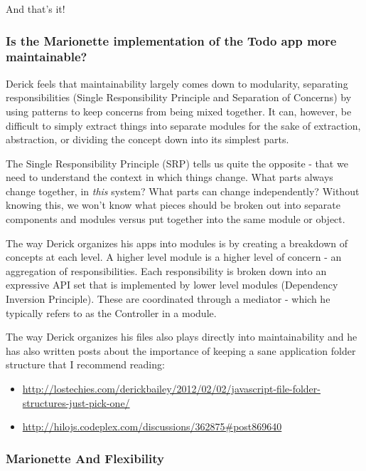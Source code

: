 \documentclass[9pt]{book}
\begin{document}
And that's it!

\subsubsection{Is the Marionette implementation of the Todo app more
maintainable?}\label{is-the-marionette-implementation-of-the-todo-app-more-maintainable}

Derick feels that maintainability largely comes down to modularity,
separating responsibilities (Single Responsibility Principle and
Separation of Concerns) by using patterns to keep concerns from being
mixed together. It can, however, be difficult to simply extract things
into separate modules for the sake of extraction, abstraction, or
dividing the concept down into its simplest parts.

The Single Responsibility Principle (SRP) tells us quite the opposite -
that we need to understand the context in which things change. What
parts always change together, in \emph{this} system? What parts can
change independently? Without knowing this, we won't know what pieces
should be broken out into separate components and modules versus put
together into the same module or object.

The way Derick organizes his apps into modules is by creating a
breakdown of concepts at each level. A higher level module is a higher
level of concern - an aggregation of responsibilities. Each
responsibility is broken down into an expressive API set that is
implemented by lower level modules (Dependency Inversion Principle).
These are coordinated through a mediator - which he typically refers to
as the Controller in a module.

The way Derick organizes his files also plays directly into
maintainability and he has also written posts about the importance of
keeping a sane application folder structure that I recommend reading:

\begin{itemize}
\itemsep1pt\parskip0pt
\item
  \url{http://lostechies.com/derickbailey/2012/02/02/javascript-file-folder-structures-just-pick-one/}
\item
  \url{http://hilojs.codeplex.com/discussions/362875\#post869640}
\end{itemize}

\subsubsection{Marionette And
Flexibility}\label{marionette-and-flexibility}
\end{document}

